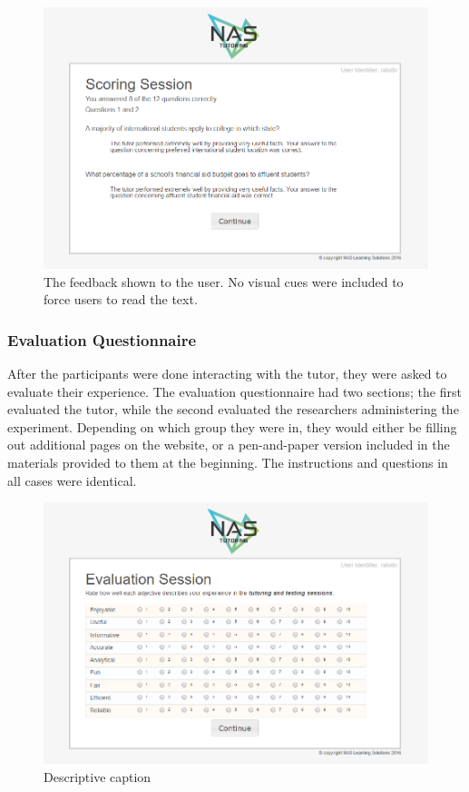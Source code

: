 \documentclass{sig-alternate-05-2015}
\begin{document}
\begin{figure}[!h]
    \includegraphics[width=\linewidth]{figures/website/08_scoring.png}
    \caption{The feedback shown to the user.  No visual cues were included to force users to read the text.}
\end{figure}
\subsubsection{Evaluation Questionnaire}
After the participants were done interacting with the tutor, they were asked to evaluate their experience.  The evaluation questionnaire had two sections; the first evaluated the tutor, while the second evaluated the researchers administering the experiment.  Depending on which group they were in, they would either be filling out additional pages on the website, or a pen-and-paper version included in the materials provided to them at the beginning.  The instructions and questions in all cases were identical. 

\begin{figure}[!h]
    \includegraphics[width=\linewidth]{figures/website/12_eval.png}
    \caption{Descriptive caption}
\end{figure}
\end{document}
